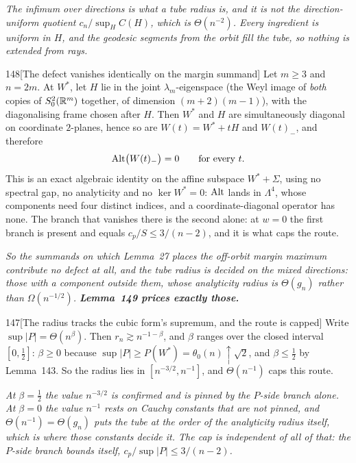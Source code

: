 \emph{The infimum over directions is what a tube radius is, and it is not the direction-uniform quotient $c_n/\sup_H C(H)$, which is $\Theta(n^{-2})$. Every ingredient is uniform in $H$, and the geodesic segments from the orbit fill the tube, so nothing is extended from rays.}

\begin{Lem}{148}[The defect vanishes identically on the margin summand]
Let $m\ge3$ and $n=2m$. At $W^*$, let $H$ lie in the joint $\lambda_m$-eigenspace (the Weyl image of \emph{both} copies of $S^2_0(\mathbb{R}^m)$ together, of dimension $(m+2)(m-1)$), with the diagonalising frame chosen after $H$. Then $W^*$ and $H$ are simultaneously diagonal on coordinate $2$-planes, hence so are $W(t)=W^*+tH$ and $W(t)_-$, and therefore
\[
\mathrm{Alt}\big(W(t)_-\big)=0\qquad\text{for every }t .
\]
This is an exact algebraic identity on the affine subspace $W^*+\Sigma$, using no spectral gap, no analyticity and no $\ker W^*=0$: $\mathrm{Alt}$ lands in $\Lambda^4$, whose components need four distinct indices, and a coordinate-diagonal operator has none. The branch that vanishes there is the second alone: at $w=0$ the first branch is present and equals $c_p/S\le 3/(n-2)$, and it is what caps the route.
\end{Lem}

\emph{So the summands on which Lemma~27 places the off-orbit margin maximum contribute no defect at all, and the tube radius is decided on the mixed directions: those with a component outside them, whose analyticity radius is $\Theta(g_n)$ rather than $\Omega(n^{-1/2})$. \textbf{Lemma~149 prices exactly those.}}

\begin{Lem}{147}[The radius tracks the cubic form's supremum, and the route is capped]
Write $\sup\lvert P\rvert=\Theta(n^\beta)$. Then $r_n\gtrsim n^{-1-\beta}$, and $\beta$ ranges over the closed interval $[0,\tfrac12]$: $\beta\ge0$ because $\sup\lvert P\rvert\ge P(W^*)=\theta_0(n)\uparrow\sqrt2$, and $\beta\le\tfrac12$ by Lemma~143. So the radius lies in $[n^{-3/2},n^{-1}]$, and $\Theta(n^{-1})$ caps this route.
\end{Lem}

\emph{At $\beta=\tfrac12$ the value $n^{-3/2}$ is confirmed and is pinned by the $P$-side branch alone. At $\beta=0$ the value $n^{-1}$ rests on Cauchy constants that are not pinned, and $\Theta(n^{-1})=\Theta(g_n)$ puts the tube at the order of the analyticity radius itself, which is where those constants decide it. The cap is independent of all of that: the $P$-side branch bounds itself, $c_p/\sup\lvert P\rvert\le3/(n-2)$.}

